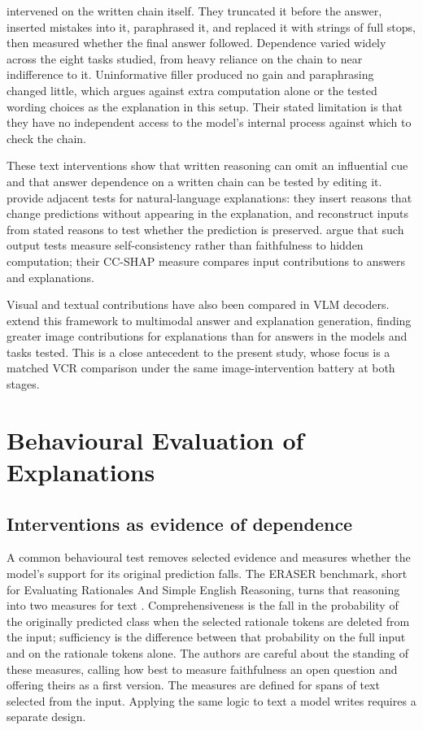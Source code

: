 \citet{DBLP:journals/corr/abs-2307-13702} intervened on the written chain itself.
They truncated it before the answer, inserted mistakes into it, paraphrased it, and
replaced it with strings of full stops, then measured whether the final answer
followed. Dependence varied widely across the eight tasks studied, from heavy
reliance on the chain to near indifference to it. Uninformative filler produced no
gain and paraphrasing changed little, which argues against extra computation
alone or the tested wording choices as the explanation in this setup. Their
stated limitation is that they
have no independent access to the model's internal process against which to check
the chain.

These text interventions show that written reasoning can omit an influential cue
and that answer dependence on a written chain can be tested by editing it.
\citet{DBLP:conf/acl/AtanasovaCLLSA23} provide adjacent tests for natural-language
explanations: they insert reasons that change predictions without appearing in
the explanation, and reconstruct inputs from stated reasons to test whether
the prediction is preserved. \citet{ParcalabescuFrank24CCSHAP} argue that such
output tests measure self-consistency rather than faithfulness to hidden
computation; their CC-SHAP measure compares input contributions to answers and
explanations.

Visual and textual contributions have also been compared in VLM decoders.
\citet{ParcalabescuFrank25VLM} extend this framework to multimodal answer and
explanation generation, finding greater image contributions for explanations
than for answers in the models and tasks tested. This is a close antecedent to
the present study, whose focus is a matched VCR comparison under the same
image-intervention battery at both stages.

\section{Behavioural Evaluation of Explanations}
\label{sec:background-behavioural}

\subsection{Interventions as evidence of dependence}
\label{sec:background-interventions}

A common behavioural test removes selected evidence and measures whether the
model's support for its original prediction falls. The ERASER benchmark, short for
Evaluating Rationales And Simple English Reasoning, turns that reasoning
into two measures for text \citep{DeYoungEtAl20ERASER}. Comprehensiveness is the
fall in the probability of the originally predicted class when the selected
rationale tokens are deleted from the input; sufficiency is the difference
between that probability on the full input and on the rationale tokens alone.
The authors are careful about the standing of these measures, calling how best
to measure faithfulness an open question and offering theirs as a first version.
The measures are defined for spans of text selected from the input. Applying the
same logic to text a model writes requires a separate design.

